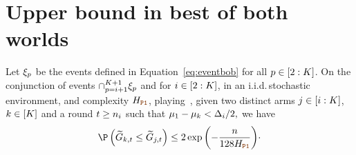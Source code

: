 %
\section{Upper bound in best of both worlds} %
\label{app:proofupBOB}
%
%
%	 
\begin{lemma}\label{l:errTwoArms}
	    Let $\xi_p$  be the events defined in Equation~\ref{eq:eventbob} for all $p\in[2:K]$.
	On the conjunction of events $\cap_{p=i+1}^{K+1}
	\xi_{p}$ and for
$i\in[2:K]$,	in an i.i.d.\,stochastic 
environment, and complexity $\complexityProOne$, playing~\Pone{},
	given two distinct  arms  $ j \in [i:K] $, $k\in[K]$   and 
	a round $t\geq n_{i}$ such that $\mu_1-\mu_k< \Delta_{i}/2,$
	we have
	\[
\Pro\left(\estCumulGainVector_{k,t}\leq  \estCumulGainVector_{j,t} \right)
	\leq
 2\exp\left(-\frac{\timeHorizon}{128\complexityProOne}\right)\!\cdot
%
	\]
\end{lemma}
%  
